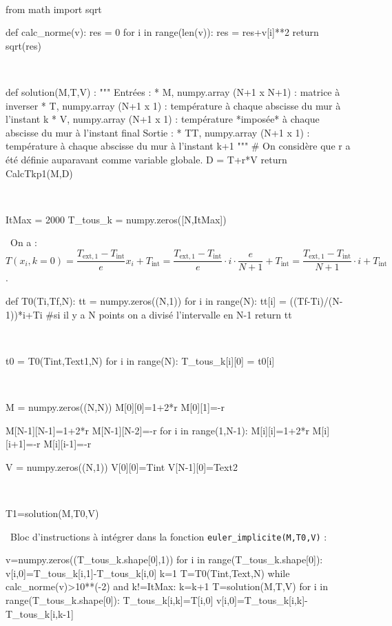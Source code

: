 \begin{corrige}
\question\
\begin{python}
from math import sqrt

def calc_norme(v):
    res = 0
    for i in range(len(v)):
        res = res+v[i]**2
    return sqrt(res)        
\end{python}


\question\
\begin{python}
def solution(M,T,V) :
    """
    Entrées : 
        * M, numpy.array (N+1 x N+1) : matrice à inverser
        * T, numpy.array (N+1 x 1) : température à chaque abscisse du mur à l'instant k
        * V, numpy.array (N+1 x 1) : température *imposée* à chaque abscisse du mur à l'instant final
    Sortie : 
        * TT, numpy.array (N+1 x 1) : température à chaque abscisse du mur à l'instant k+1
    """
    # On considère que r a été définie auparavant comme variable globale.
    D = T+r*V
    return CalcTkp1(M,D)
\end{python}

\question\
\begin{python}
ItMax = 2000
T_tous_k = numpy.zeros([N,ItMax])
\end{python}
\question\
On a : $T(x_i,k=0)=\dfrac{T_{\text{ext},1}-T_{\text{int}}}{e}x_i + T_{\text{int}} = 
\dfrac{T_{\text{ext},1}-T_{\text{int}}}{e}\cdot i \cdot \dfrac{e}{N+1} + T_{\text{int}} =  
\dfrac{T_{\text{ext},1}-T_{\text{int}}}{N+1}\cdot i  + T_{\text{int}}$.

\begin{python}
def T0(Ti,Tf,N):
    tt =  numpy.zeros((N,1))
    for i in range(N):
        tt[i] = ((Tf-Ti)/(N-1))*i+Ti #si il y a N points on a divisé l'intervalle en N-1
    return tt
\end{python}


\question\

\begin{python}
t0 = T0(Tint,Text1,N)
for i in range(N):
    T_tous_k[i][0] = t0[i]
\end{python}


\question\
\begin{python}
M = numpy.zeros((N,N))
M[0][0]=1+2*r
M[0][1]=-r

M[N-1][N-1]=1+2*r
M[N-1][N-2]=-r
for i in range(1,N-1):
    M[i][i]=1+2*r
    M[i][i+1]=-r
    M[i][i-1]=-r

V = numpy.zeros((N,1))
V[0][0]=Tint
V[N-1][0]=Text2
\end{python}


\question\
\begin{python}
T1=solution(M,T0,V)
\end{python}
\question\
Bloc d'instructions à intégrer dans la fonction \texttt{euler\_implicite(M,T0,V)} :
\begin{python}
v=numpy.zeros((T_tous_k.shape[0],1))
for i in range(T_tous_k.shape[0]):
    v[i,0]=T_tous_k[i,1]-T_tous_k[i,0]
k=1
T=T0(Tint,Text,N)
while calc_norme(v)>10**(-2) and k!=ItMax:
    k=k+1
    T=solution(M,T,V)
    for i in range(T_tous_k.shape[0]):
        T_tous_k[i,k]=T[i,0]
        v[i,0]=T_tous_k[i,k]-T_tous_k[i,k-1]
\end{python}        
\end{corrige}
